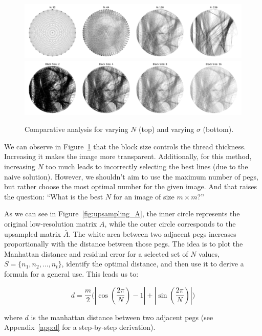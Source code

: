 \begin{figure}[H]
    \centering
    \includegraphics[width=\linewidth]{images/tuning/lls_column_2_as_row.pdf}
    \includegraphics[width=\linewidth]{images/tuning/lls_row_2.pdf}
    \caption{Comparative analysis for varying \(N\) (top) and varying \(\sigma\) (bottom).}
    \label{fig:n_sigma_tuning}
\end{figure}

We can observe in Figure~\ref{fig:n_sigma_tuning} that the block size controls the thread thickness. Increasing it makes the image more transparent. Additionally, for this method, increasing \(N\) too much leads to incorrectly selecting the best lines (due to the naive solution). However, we shouldn't aim to use the maximum number of pegs, but rather choose the most optimal number for the given image. And that raises the question: \enquote{What is the best \(N\) for an image of size \(m \times m\)?}

As we can see in Figure~\ref{fig:upsampling_A}, the inner circle represents the original low-resolution matrix \(A\), while the outer circle corresponds to the upsampled matrix \(\bar{A}\). The white area between two adjacent pegs increases proportionally with the distance between those pegs. The idea is to plot the Manhattan distance and residual error for a selected set of \(N\) values, \(S = \{n_1, n_2, \ldots, n_t\}\), identify the optimal distance, and then use it to derive a formula for a general use. This leads us to:

\[
d = \frac{m}{2}\bigg(\left| \cos(\frac{2\pi}{N}) - 1 \right| + \left|  \sin(\frac{2\pi}{N})\right|\bigg)
\]

where \(d\) is the manhattan distance between two adjacent pegs (see Appendix~\ref{app:d} for a step-by-step derivation). 

